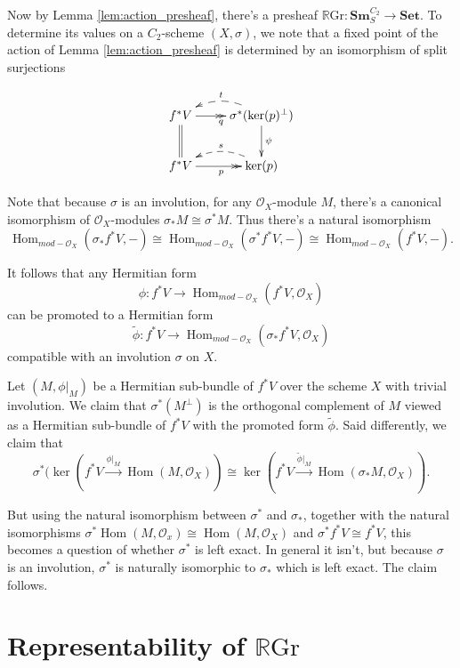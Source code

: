\documentclass[edeposit,fullpage]{uiucthesis2009}
\newcommand{\mc}{\mathcal}
\newcommand{\RGr}{\mathbb R\mathrm{Gr}}
\newcommand{\Set}{\mathbf{Set}}
\newcommand{\Sm}[1]{\mathbf{Sm}_{#1}}
\DeclareMathOperator{\Hom}{Hom}
\theoremstyle{plain}
\numberwithin{lemma}{section}
\theoremstyle{definition}
\begin{document}
Now by Lemma \ref{lem:action_presheaf}, there's a presheaf $\RGr :
\Sm{S}^{C_2} \rightarrow \Set$. To determine its values on a
$C_2$-scheme $(X,\sigma)$, we note that a fixed point of the action of Lemma
\ref{lem:action_presheaf} is determined by an isomorphism of split
surjections

\[
\xymatrix{f^*V \ar@{>>}[r]_q \ar@{=}[d]& \ar@/_1.0pc/@{-->}[l]_t\sigma^*(\ker(p)^\perp) \ar[d]^\psi\\
f^*V \ar@{>>}[r]_{p} & \ar@/_1.0pc/@{-->}[l]_{s}\ker(p)}
\]

Note that because $\sigma$ is an involution, for any $\mc O_X$-module
$M$, there's a canonical isomorphism of $\mc O_X$-modules $\sigma_*M \cong
\sigma^*M$. Thus there's a natural isomorphism 
\[
\Hom_{mod-\mc
  O_X}(\sigma_*f^*V,-) \cong \Hom_{mod-\mc O_X}(\sigma^*f^*V,-) \cong
\Hom_{mod-\mc O_X}(f^*V,-).
\]

It follows that any Hermitian form
\[
\phi : f^*V \rightarrow \Hom_{mod-\mc O_X}(f^*V,\mc O_X)
\]
can be promoted to a Hermitian form
\[
\widetilde\phi : f^*V \rightarrow \Hom_{mod-\mc O_X}(\sigma_*f^*V,\mc O_X)
\]
compatible with an involution $\sigma$ on $X$.

Let $(M,\phi|_M)$ be a Hermitian sub-bundle of $f^*V$ over the scheme $X$ with
trivial involution. We claim that $\sigma^*(M^\perp)$ is the
orthogonal complement of $M$ viewed as a Hermitian sub-bundle of
$f^*V$ with the promoted form $\widetilde \phi$. Said differently, we
claim that
\[
\sigma^*(\ker(f^*V \xrightarrow{\phi|_M} \Hom(M,\mc O_X)) \cong \ker(f^*V
\xrightarrow{\widetilde \phi|_M} \Hom(\sigma_*M,\mc O_X)).
\]

But using the natural isomorphism between $\sigma^*$ and $\sigma_*$,
together with the natural isomorphisms $\sigma^*\Hom(M,\mc O_x) \cong
\Hom(M,\mc O_X)$ and $\sigma^*f^*V \cong f^*V$, this becomes a question
of whether $\sigma^*$ is left exact. In general it isn't, but because
$\sigma$ is an involution, $\sigma^*$ is naturally isomorphic to
$\sigma_*$ which is left exact. The claim follows.



\section{Representability of $\RGr$}\label{subsec:representability}
\end{document}
